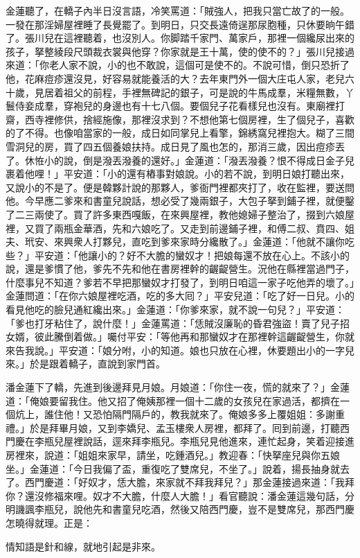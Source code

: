 金蓮聽了，在轎子內半日沒言語，冷笑罵道：「賊強人，把我只當亡故了的一般。一發在那淫婦屋裡睡了長覺罷了。到明日，只交長遠倚逞那尿胞種，只休要晌午錯了。張川兒在這裡聽着，也沒別人。你脚踏千家門、萬家戶，那裡一個纔尿出來的孩子，拏整綾段尺頭裁衣裳與他穿？你家就是王十萬，使的使不的？」張川兒接過來道：「你老人家不說，小的也不敢說，這個可是使不的。不說可惜，倒只恐折了他，{}花麻痘疹還沒見，好容易就能養活的大？去年東門外一個大庄屯人家，老兒六十歲，見居着祖父的前程，手裡無碑記的銀子，可是說的牛馬成羣，米糧無數，丫鬟侍妾成羣，穿袍兒的身邊也有十七八個。要個兒子花看樣兒也沒有。東廟裡打齋，西寺裡修供，捨經施像，那裡沒求到？不想他第七個房裡，生了個兒子，喜歡的了不得。也像咱當家的一般，成日如同掌兒上看擎，錦綉窩兒裡抱大。糊了三間雪洞兒的房，買了四五個養娘扶持。成日見了風也怎的，那消三歲，因出痘疹丟了。休恠小的說，倒是潑丟潑養的還好。」金蓮道：「潑丟潑養？恨不得成日金子兒裹着他哩！」平安道：「小的還有樁事對娘說。小的若不說，到明日娘打聽出來，又說小的不是了。便是韓夥計說的那夥人，爹衙門裡都夾打了，收在監裡，要送問他。今早應二爹來和書童兒說話，想必受了幾兩銀子，大包子拏到鋪子裡，就便鑿了二三兩使了。買了許多東西嘎飯，在來興屋裡，教他媳婦子整治了，掇到六娘屋裡，又買了兩瓶金華酒，先和六娘吃了。又走到前邊鋪子裡，和傅二叔、賁四、姐夫、玳安、來興衆人打夥兒，直吃到爹來家時分纔散了。」金蓮道：「他就不讓你吃些？」平安道：「他讓小的？好不大膽的蠻奴才！把娘每還不放在心上。不該小的說，還是爹慣了他，爹先不先和他在書房裡幹的齷齪營生。{}況他在縣裡當過門子，什麼事兒不知道？爹若不早把那蠻奴才打發了，到明日咱這一家子吃他弄的壞了。」金蓮問道：「在你六娘屋裡吃酒，吃的多大囘？」平安兒道：「吃了好一日兒。小的看見他吃的臉兒通紅纔出來。」金蓮道：「你爹來家，就不說一句兒？」平安道：「爹也打牙粘住了，說什麼！」金蓮罵道：「恁賊沒廉恥的昏君強盜！賣了兒子招女婿，彼此騰倒着做。」{}囑付平安：「等他再和那蠻奴才在那裡幹這齷齪營生，你就來告我說。」平安道：「娘分咐，小的知道。娘也只放在心裡，休要題出小的一字兒來。」於是跟着轎子，直說到家門首。

潘金蓮下了轎，先進到後邊拜見月娘。月娘道：「你住一夜，慌的就來了？」金蓮道：「俺娘要留我住。他又招了俺姨那裡一個十二歲的女孩兒在家過活，都擠在一個炕上，誰住他！又恐怕隔門隔戶的，教我就來了。俺娘多多上覆姐姐：多謝重禮。」於是拜畢月娘，又到李嬌兒、孟玉樓衆人房裡，都拜了。囘到前邊，打聽西門慶在李瓶兒屋裡說話，逕來拜李瓶兒。李瓶兒見他進來，連忙起身，笑着迎接進房裡來，說道：「姐姐來家早，請坐，吃鍾酒兒。」教迎春：「快拏座兒與你五娘坐。」金蓮道：「今日我偏了盃，重復吃了雙席兒，不坐了。」說着，揚長抽身就去了。西門慶道：「好奴才，恁大膽，來家就不拜我拜兒？」那金蓮接過來道：「我拜你？還沒修福來哩。奴才不大膽，什麼人大膽！」看官聽說：潘金蓮這幾句話，分明譏諷李瓶兒，說他先和書童兒吃酒，然後又陪西門慶，豈不是雙席兒，那西門慶怎曉得就理。正是：

\begin{myquote} 
情知語是針和線，就地引起是非來。
\end{myquote} 

